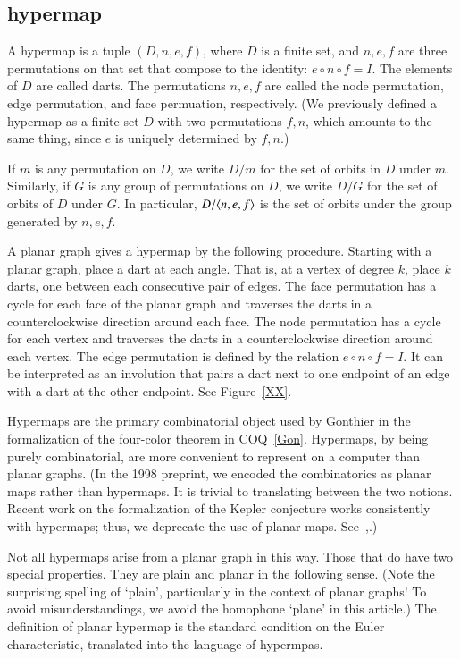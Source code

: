 \subsection{hypermap}

A hypermap is a tuple $(D,n,e,f)$, where $D$ is a finite
set, and $n,e,f$ are three permutations on that set that
compose to the identity:
$e\circ n\circ f = I$.  The elements of $D$ are called darts.
The permutations $n,e,f$ are called the node permutation,
edge permutation, and face permuation, respectively.
(We previously defined a hypermap as a finite set $D$ with
two permutations $f,n$, which amounts to the same thing,
since $e$ is uniquely determined by $f,n$.)

If $m$ is any permutation on $D$, we write $D/m$ for the
set of orbits in $D$ under $m$.  Similarly, if $G$ is any
group of permutations on $D$, we write $D/G$ for the set
of orbits of $D$ under $G$.  In particular, $D/\langle n,e,f\rangle$
is the set of orbits under the group generated by $n,e,f$.

A planar graph gives  a hypermap
by the following procedure.  Starting with a planar graph,
place a dart at each angle.  That is, at a vertex of degree $k$,
place $k$ darts, one between each consecutive pair of edges.
The face permutation has a cycle for
each face of the planar graph and  traverses the
darts in a counterclockwise direction around each face.
The node permutation has a cycle for each vertex and traverses
the darts in a counterclockwise direction around each vertex.
The edge permutation is defined by the relation $e\circ n\circ f=I$.
It can be interpreted as an involution that pairs a dart next
to one endpoint of an edge with a dart at the other endpoint.
See Figure~\ref{XX}.

Hypermaps are the primary combinatorial object used by Gonthier
in the formalization of the four-color theorem in COQ~\ref{Gon}.
Hypermaps, by being purely combinatorial, are more convenient
to represent on a computer than planar graphs.  (In the 1998
preprint, we encoded the combinatorics as planar maps rather
than hypermaps.  It is trivial to translating between the two notions.
Recent work on the formalization of the Kepler conjecture works
consistently with hypermaps; thus, we deprecate the use of
planar maps.  See~\cite{XXObua},\cite{XXBlue}.)

Not all hypermaps arise from a planar graph in this way.
Those that do have two special properties.  They are plain
and planar in the following sense.  (Note the surprising spelling
of `plain', particularly in the context of planar graphs!  
To avoid misunderstandings, 
we avoid the homophone `plane' in this article.)  The definition
of planar hypermap is the standard condition on the Euler
characteristic, translated into the language of hypermpas.

